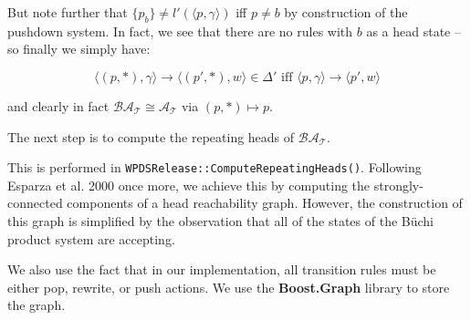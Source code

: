 \documentclass[11pt]{article}
\theoremstyle{definition}
\begin{document}
But note further that $ \{ p_b \} \neq l'(\langle p, \gamma \rangle) $ iff $ p
\neq b $ by construction of the pushdown system. In fact, we see that there are no rules with $b$ as a head state -- so finally we simply have:

\[ \langle (p, *), \gamma \rangle \rightarrow \langle (p', *), w\rangle \in \Delta' 
\text{ iff } \langle p, \gamma \rangle \rightarrow \langle p', w \rangle \]

and clearly in fact $\mathcal{BA_T} \cong \mathcal{A_T}$ via $(p, *) \mapsto p$.

The next step is to compute the repeating heads of $\mathcal{BA_T}$. 

This is performed in \texttt{WPDSRelease::ComputeRepeatingHeads()}. Following Esparza
et al. 2000 once more, we achieve this by computing the strongly-connected
components of a head reachability graph. However, the construction of this
graph is simplified by the observation that all of the states of the B\"{u}chi
product system are accepting. 

We also use the fact that in our implementation, all transition rules must be
either pop, rewrite, or push actions. We use the \textbf{Boost.Graph} library
to store the graph.
\end{document}
